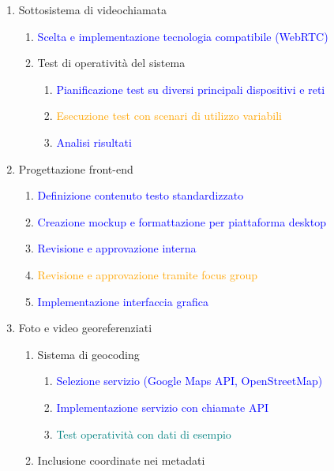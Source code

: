 \documentclass[a4paper,12pt, openright]{report}
\begin{document}
\begin{enumerate}
\begin{enumerate}
        \item Sottosistema di videochiamata
        \begin{enumerate}
            \item \textcolor{blue}{Scelta e implementazione tecnologia compatibile (WebRTC)}
            \item Test di operatività del sistema
            \begin{enumerate}
                \item \textcolor{blue}{Pianificazione test su diversi principali dispositivi e reti}
                \item \textcolor{orange}{Esecuzione test con scenari di utilizzo variabili}
                \item \textcolor{blue}{Analisi risultati}
            \end{enumerate}
        \end{enumerate}
        \item Progettazione front-end
        \begin{enumerate}
            \item \textcolor{blue}{Definizione contenuto testo standardizzato}
            \item \textcolor{blue}{Creazione mockup e formattazione per piattaforma desktop}
            \item \textcolor{blue}{Revisione e approvazione interna}
            \item \textcolor{orange}{Revisione e approvazione tramite focus group}
            \item \textcolor{blue}{Implementazione interfaccia grafica}
        \end{enumerate}  
        \item Foto e video georeferenziati
        \begin{enumerate}
            \item Sistema di geocoding
            \begin{enumerate}
                \item \textcolor{blue}{Selezione servizio (Google Maps API, OpenStreetMap)}
                \item \textcolor{blue}{Implementazione servizio con chiamate API}
                \item \textcolor{teal}{Test operatività con dati di esempio}
            \end{enumerate}
            \item Inclusione coordinate nei metadati
            \begin{enumerate}

\end{enumerate}
\end{enumerate}
\end{enumerate}
\end{enumerate}
\end{document}
